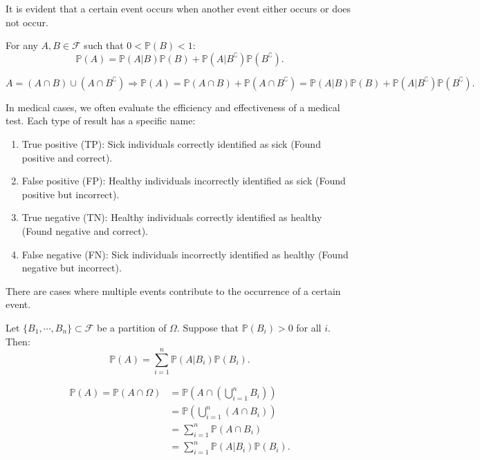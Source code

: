 \documentclass{huhtakm-template-book-v2}
\newcommand{\prob}{\mathbb{P}}
\begin{document}
    It is evident that a certain event occurs when another event either occurs or does not occur.
    \begin{lem}
        For any $A,B \in \mathcal{F}$ such that $0 < \prob(B) < 1$:
        \begin{equation*}
            \prob(A) = \prob(A|B)\prob(B)+\prob(A|B^{\complement})\prob(B^{\complement}).
        \end{equation*}
    \end{lem}
    \begin{proofing}
        \begin{equation*}
            A = (A\cap B)\cup(A\cap B^{\complement}) \Longrightarrow \prob(A) = \prob(A\cap B)+\prob(A\cap B^{\complement}) = \prob(A|B)\prob(B)+\prob(A|B^{\complement})\prob(B^{\complement}).
        \end{equation*}
    \end{proofing}
    \begin{eg}
        In medical cases, we often evaluate the efficiency and effectiveness of a medical test. Each type of result has a specific name:
        \begin{enumerate}
            \item True positive (TP): Sick individuals correctly identified as sick (Found positive and correct).
            \item False positive (FP): Healthy individuals incorrectly identified as sick (Found positive but incorrect).
            \item True negative (TN): Healthy individuals correctly identified as healthy (Found negative and correct).
            \item False negative (FN): Sick individuals incorrectly identified as healthy (Found negative but incorrect).
        \end{enumerate}
    \end{eg}
    There are cases where multiple events contribute to the occurrence of a certain event.
    \begin{lem}
        Let $\{B_{1},\cdots,B_{n}\}\subset\mathcal{F}$ be a partition of $\Omega$. Suppose that $\prob(B_{i}) > 0$ for all $i$. Then:
        \begin{equation*}
            \prob(A) = \sum_{i = 1}^{n}\prob(A|B_{i})\prob(B_{i}).
        \end{equation*}
    \end{lem}
    \begin{proofing}
        \begin{align*}
            \prob(A) = \prob(A\cap\Omega) &= \prob\left(A\cap\left(\bigcup_{i = 1}^{n}B_{i}\right)\right)\\
            &= \prob\left(\bigcup_{i = 1}^{n}(A\cap B_{i})\right)\\
            &= \sum_{i = 1}^{n}\prob(A\cap B_{i})\\
            &= \sum_{i = 1}^{n}\prob(A|B_{i})\prob(B_{i}).
        \end{align*}
    \end{proofing}
\end{document}
